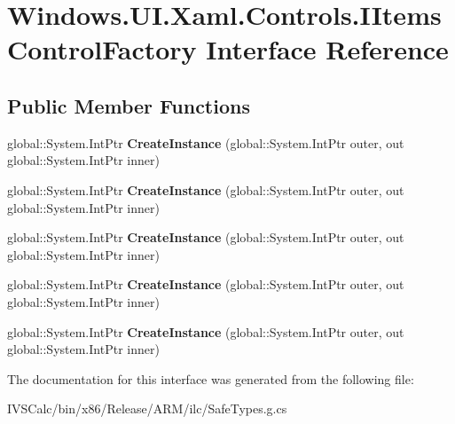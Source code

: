\hypertarget{interface_windows_1_1_u_i_1_1_xaml_1_1_controls_1_1_i_items_control_factory}{}\section{Windows.\+U\+I.\+Xaml.\+Controls.\+I\+Items\+Control\+Factory Interface Reference}
\label{interface_windows_1_1_u_i_1_1_xaml_1_1_controls_1_1_i_items_control_factory}
\subsection*{Public Member Functions}
\begin{DoxyCompactItemize}
\item 
\mbox{\label{interface_windows_1_1_u_i_1_1_xaml_1_1_controls_1_1_i_items_control_factory_ad314bdcc9c96e31fae2975680a9a0028}} 
global\+::\+System.\+Int\+Ptr {\bfseries Create\+Instance} (global\+::\+System.\+Int\+Ptr outer, out global\+::\+System.\+Int\+Ptr inner)
\item 
\mbox{\label{interface_windows_1_1_u_i_1_1_xaml_1_1_controls_1_1_i_items_control_factory_ad314bdcc9c96e31fae2975680a9a0028}} 
global\+::\+System.\+Int\+Ptr {\bfseries Create\+Instance} (global\+::\+System.\+Int\+Ptr outer, out global\+::\+System.\+Int\+Ptr inner)
\item 
\mbox{\label{interface_windows_1_1_u_i_1_1_xaml_1_1_controls_1_1_i_items_control_factory_ad314bdcc9c96e31fae2975680a9a0028}} 
global\+::\+System.\+Int\+Ptr {\bfseries Create\+Instance} (global\+::\+System.\+Int\+Ptr outer, out global\+::\+System.\+Int\+Ptr inner)
\item 
\mbox{\label{interface_windows_1_1_u_i_1_1_xaml_1_1_controls_1_1_i_items_control_factory_ad314bdcc9c96e31fae2975680a9a0028}} 
global\+::\+System.\+Int\+Ptr {\bfseries Create\+Instance} (global\+::\+System.\+Int\+Ptr outer, out global\+::\+System.\+Int\+Ptr inner)
\item 
\mbox{\label{interface_windows_1_1_u_i_1_1_xaml_1_1_controls_1_1_i_items_control_factory_ad314bdcc9c96e31fae2975680a9a0028}} 
global\+::\+System.\+Int\+Ptr {\bfseries Create\+Instance} (global\+::\+System.\+Int\+Ptr outer, out global\+::\+System.\+Int\+Ptr inner)
\end{DoxyCompactItemize}


The documentation for this interface was generated from the following file\+:\begin{DoxyCompactItemize}
\item 
I\+V\+S\+Calc/bin/x86/\+Release/\+A\+R\+M/ilc/Safe\+Types.\+g.\+cs\end{DoxyCompactItemize}

